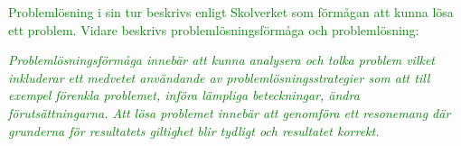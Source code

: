 
\textcolor{green}{Problemlösning i sin tur beskrivs enligt Skolverket som förmågan att kunna lösa ett problem. Vidare beskrivs problemlösningsförmåga och problemlösning:}



\begin{displayquote}
\textcolor{green}{\textsl{Problemlösningsförmåga innebär att kunna analysera och tolka problem vilket inkluderar ett medvetet användande av problemlösningsstrategier som att till exempel förenkla problemet, införa lämpliga beteckningar, ändra förutsättningarna. Att lösa problemet innebär att genomföra ett resonemang där grunderna för resultatets giltighet blir tydligt och resultatet korrekt.}}
\end{displayquote}


